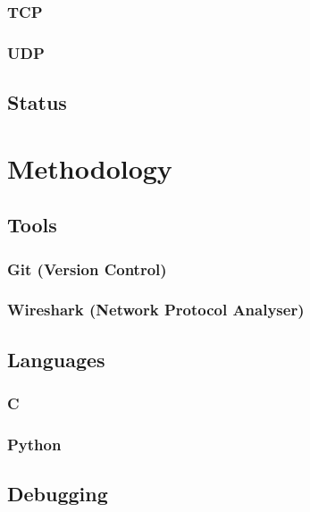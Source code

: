 			\subsubsection{TCP}
			
			\subsubsection{UDP}
		
		\subsection{Status}
	
	\section{Methodology}
		
		\subsection{Tools}
			
			\subsubsection{Git (Version Control)}
			
			\subsubsection{Wireshark (Network Protocol Analyser)}
		
		\subsection{Languages}
			
			\subsubsection{C}
			
			\subsubsection{Python}
		
		\subsection{Debugging}
